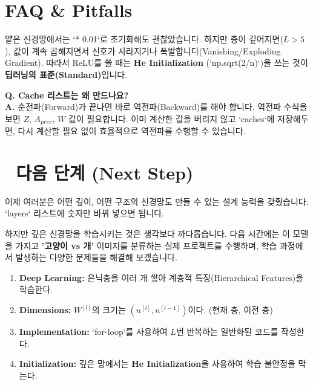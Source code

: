 \documentclass[11pt,a4paper]{book}
\theoremstyle{definition}
\begin{document}
\section{FAQ \& Pitfalls}

\begin{warningbox}[title={파라미터 초기화: 0.01 vs He Initialization}]
얕은 신경망에서는 `* 0.01`로 초기화해도 괜찮았습니다.
하지만 층이 깊어지면($L > 5$), 값이 계속 곱해지면서 신호가 사라지거나 폭발합니다(Vanishing/Exploding Gradient).
따라서 ReLU를 쓸 때는 \textbf{He Initialization} (`np.sqrt(2/n)`)을 쓰는 것이 \textbf{딥러닝의 표준(Standard)}입니다.
\end{warningbox}

\textbf{Q. Cache 리스트는 왜 만드나요?} \\
\textbf{A.} 순전파(Forward)가 끝나면 바로 역전파(Backward)를 해야 합니다. 역전파 수식을 보면 $Z$, $A_{prev}$, $W$ 값이 필요합니다. 이미 계산한 값을 버리지 않고 `caches`에 저장해두면, 다시 계산할 필요 없이 효율적으로 역전파를 수행할 수 있습니다.

\section*{🔗 다음 단계 (Next Step)}
이제 여러분은 어떤 깊이, 어떤 구조의 신경망도 만들 수 있는 설계 능력을 갖췄습니다. `layers` 리스트에 숫자만 바꿔 넣으면 됩니다.

하지만 깊은 신경망을 학습시키는 것은 생각보다 까다롭습니다. 
다음 시간에는 이 모델을 가지고 \textbf{'고양이 vs 개'} 이미지를 분류하는 실제 프로젝트를 수행하며, 학습 과정에서 발생하는 다양한 문제들을 해결해 보겠습니다.

\vspace{0.5cm}

\begin{summarybox}[title={단원 요약 (Cheat Sheet)}]
\begin{enumerate}
    \item \textbf{Deep Learning:} 은닉층을 여러 개 쌓아 계층적 특징(Hierarchical Features)을 학습한다.
    \item \textbf{Dimensions:} $W^{[l]}$의 크기는 $(n^{[l]}, n^{[l-1]})$이다. (현재 층, 이전 층)
    \item \textbf{Implementation:} `for-loop`를 사용하여 $L$번 반복하는 일반화된 코드를 작성한다.
    \item \textbf{Initialization:} 깊은 망에서는 \textbf{He Initialization}을 사용하여 학습 불안정을 막는다.
\end{enumerate}
\end{summarybox}
\end{document}
